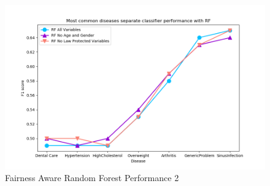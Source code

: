 \documentclass[runningheads]{llncs}
\begin{document}
\begin{figure}[H]
\includegraphics[width=\textwidth,keepaspectratio]{figs/image2.png}
\caption{Fairness Aware Random Forest Performance 2}
\label{fig:fai_rn2}
\centering
\end{figure}
\end{document}

